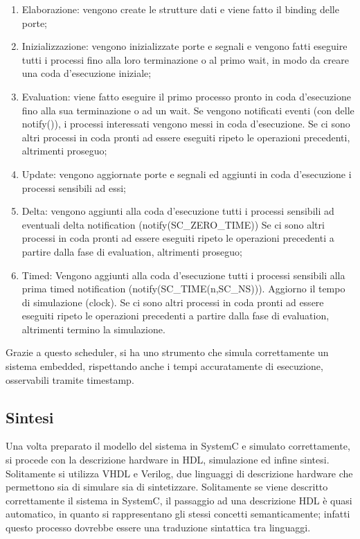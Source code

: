 \documentclass[11pt]{article} %
\begin{document}
\begin{enumerate}
\item Elaborazione: vengono create le strutture dati e viene fatto il binding delle porte; 
\item Inizializzazione: vengono inizializzate porte e segnali e vengono fatti eseguire tutti i processi fino alla loro terminazione o al primo wait, in modo da creare una coda d'esecuzione iniziale; 
\item Evaluation: viene fatto eseguire il primo processo pronto in coda d'esecuzione fino alla sua terminazione o ad un wait. Se vengono notificati eventi (con delle notify()), i processi interessati vengono messi in coda d'esecuzione. Se ci sono altri processi in coda pronti ad essere eseguiti ripeto le operazioni precedenti, altrimenti proseguo;
\item Update: vengono aggiornate porte e segnali ed aggiunti in coda d'esecuzione i processi sensibili ad essi; 
\item Delta: vengono aggiunti alla coda d'esecuzione tutti i processi sensibili ad eventuali delta notification (notify(SC\_ZERO\_TIME)) Se ci sono altri processi in coda pronti ad essere eseguiti ripeto le operazioni precedenti a partire dalla fase di evaluation, altrimenti proseguo;
\item Timed: Vengono aggiunti alla coda d'esecuzione tutti i processi sensibili alla prima timed notification (notify(SC\_TIME(n,SC\_NS))). Aggiorno il tempo di simulazione (clock). Se ci sono altri processi in coda pronti ad essere eseguiti ripeto le operazioni precedenti a partire dalla fase di evaluation, altrimenti termino la simulazione. 
\end{enumerate}

Grazie a questo scheduler, si ha uno strumento che simula correttamente un sistema embedded, rispettando anche i tempi accuratamente di esecuzione, osservabili tramite timestamp.

\subsection{Sintesi}

Una volta preparato il modello del sistema in SystemC e simulato correttamente, si procede con la descrizione hardware in HDL, simulazione ed infine sintesi. Solitamente si utilizza VHDL e Verilog, due linguaggi di descrizione hardware che permettono sia di simulare sia di sintetizzare. Solitamente se viene descritto correttamente il sistema in SystemC, il passaggio ad una descrizione HDL è quasi automatico, in quanto si rappresentano gli stessi concetti semanticamente; infatti questo processo dovrebbe essere una traduzione sintattica tra linguaggi.
\end{document}
